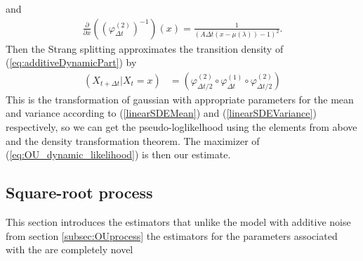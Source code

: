 and 
\begin{align}
    \frac{\partial}{\partial x} \left(\left(\varphi^{(2)}_{\Delta t}\right)^{-1}\right)(x) = \frac{1}{\left(A \Delta t\left(x-\mu\left(\lambda \right)\right) - 1\right)^2}.
\end{align}
Then the Strang splitting approximates the transition density of (\ref{eq:additiveDynamicPart}) by
\begin{align}
    \left(X_{t + \Delta t} | X_t = x\right) &= \left(\varphi^{(2)}_{\Delta t / 2}\circ \varphi^{(1)}_{\Delta t} \circ \varphi^{(2)}_{\Delta t / 2}\right) \label{eq:OU_dynamic_likelihood}
\end{align}
This is the transformation of gaussian with appropriate parameters for the mean and variance according to (\ref{linearSDEMean}) and (\ref{linearSDEVariance}) respectively, so we can get the pseudo-loglikelhood using the elements from above and the density transformation theorem. The maximizer of (\ref{eq:OU_dynamic_likelihood}) is then our estimate. 
\subsection{Square-root process}\label{subsec:squareroot}
This section introduces the estimators that unlike the model with additive noise from section \ref{subsec:OUprocess} the estimators for the parameters associated with the are completely novel 
